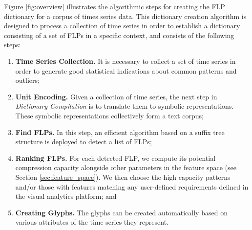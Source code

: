 Figure \ref{fig:overview} illustrates the algorithmic steps for creating the FLP dictionary for a corpus of times series data.
This dictionary creation algorithm is designed to process a collection of time series in order to establish a dictionary consisting of a set of FLPs in a specific context, and consists of the following steps:

\begin{enumerate}
\item\textbf{Time Series Collection.}
It is necessary to collect a set of time series in order to generate good statistical indications about common patterns and outliers;
\item\textbf{Unit Encoding.}
Given a collection of time series, the next step in \emph{Dictionary Compilation} is to translate them to symbolic representations.
These symbolic representations collectively form a text corpus;
\item\textbf{Find FLPs.} In this step, an efficient algorithm based on a suffix tree structure is deployed to detect a list of FLPs;
\item\textbf{Ranking FLPs.} For each detected FLP, we compute its potential compression capacity alongside other parameters in the feature space (see Section \ref{sec:feature_space}). We then choose the high capacity patterns and/or those with features matching any user-defined requirements defined in the visual analytics platform; and
\item\textbf{Creating Glyphs.} The glyphs can be created automatically based on various attributes of the time series they represent.
\end{enumerate}
%
%
%
%
%

